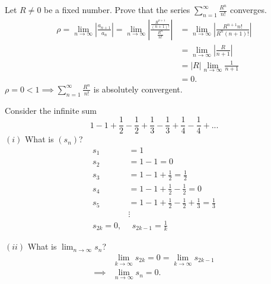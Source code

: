 \begin{example}
    Let $R \not = 0$ be a fixed number. Prove that the series $\sum_{n=1}^{\infty} \frac{R^n}{n!}$ converges.
    \begin{align*}
        \rho = \lim_{n\to \infty} \left|\frac{a_{n+1}}{a_n}\right| = \lim_{n \to \infty} \left|\frac{\frac{R^{n+1}}{(n+1)!}}{\frac{R^n}{n!}}\right| &= \lim_{n\to \infty} \left|\frac{R^{n+1}n!}{R^n (n+1)!}\right| \\
        &=\lim_{n \to \infty} \left|\frac{R}{n+1}\right| \\
        &= |R| \lim_{n\to \infty} \frac{1}{n+1} \\
        &= 0.
    \end{align*}
    $\rho = 0 < 1 \implies \sum_{n=1}^{\infty} \frac{R^n}{n!}$ is absolutely convergent.
\end{example}


\begin{example}
    Consider the infinite sum
    $$1-1+\frac{1}{2} - \frac{1}{2} +\frac{1}{3} - \frac{1}{3} + \frac{1}{4} - \frac{1}{4} +...$$
    $(i)$ What is $(s_n)$?
    \begin{align*}
        s_1 &= 1 \\
        s_2 &= 1 - 1 = 0 \\
        s_3 &= 1 - 1 + \frac{1}{2} = \frac{1}{2} \\
        s_4 &= 1 - 1 + \frac{1}{2} - \frac{1}{2} = 0 \\
        s_5 &= 1 - 1 + \frac{1}{2} - \frac{1}{2} + \frac{1}{3} = \frac{1}{3} \\
        &\vdots \\
        s_{2k} = 0,& ~~s_{2k-1} = \frac{1}{k}
    \end{align*}

    $(ii)$ What is $\lim_{n \to \infty} s_n$?
    \begin{align*}
        &\lim_{k \to \infty} s_{2k} = 0 = \lim_{k \to \infty} s_{2k-1} \\
        \implies &\lim_{n \to \infty} s_n = 0.
    \end{align*}
\end{example}

